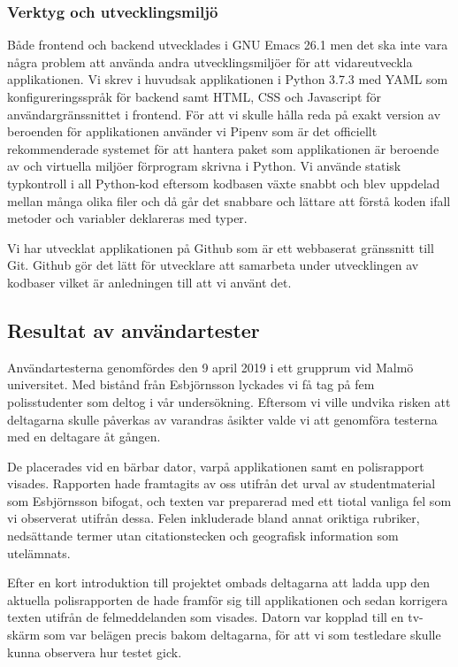 \documentclass[swedish]{maucsthesis}
\begin{document}
\subsubsection{Verktyg och utvecklingsmiljö}

Både frontend och backend utvecklades i GNU Emacs 26.1 men det ska inte vara några
problem att använda andra utvecklingsmiljöer för att vidareutveckla
applikationen. Vi skrev i huvudsak applikationen i Python 3.7.3 med YAML som
konfigureringsspråk för backend samt HTML, CSS och Javascript för
användargränssnittet i frontend. För att vi skulle hålla reda på exakt version
av beroenden för applikationen använder vi Pipenv som är det officiellt
rekommenderade systemet för att hantera paket som applikationen är beroende av
och virtuella miljöer förprogram skrivna i Python. Vi använde statisk typkontroll
i all Python-kod eftersom kodbasen växte snabbt och blev uppdelad
mellan många olika filer och då går det snabbare och lättare att förstå
koden ifall metoder och variabler deklareras med typer.

Vi har utvecklat applikationen på Github som är ett webbaserat gränssnitt till
Git. Github gör det lätt för utvecklare att samarbeta under utvecklingen av kodbaser
vilket är anledningen till att vi använt det.


\subsection{Resultat av användartester}\label{resultatanvändartester}

Användartesterna genomfördes den 9 april 2019 i ett grupprum vid Malmö
universitet. Med bistånd från Esbjörnsson lyckades vi få tag
på fem polisstudenter som deltog i vår undersökning. Eftersom vi ville undvika risken att
deltagarna skulle påverkas av varandras åsikter valde vi att genomföra testerna
med en deltagare åt gången.

De placerades vid en bärbar dator, varpå applikationen samt en polisrapport
visades. Rapporten hade framtagits av oss utifrån det urval av studentmaterial
som Esbjörnsson bifogat, och texten var preparerad med ett tiotal vanliga
fel som vi observerat utifrån dessa. Felen inkluderade bland annat oriktiga
rubriker, nedsättande termer utan citationstecken och geografisk information som
utelämnats.

Efter en kort introduktion till projektet ombads deltagarna att ladda upp den
aktuella polisrapporten de hade framför sig till applikationen och sedan
korrigera texten utifrån de felmeddelanden som visades. Datorn var kopplad till
en tv-skärm som var belägen precis bakom deltagarna, för att vi som
testledare skulle kunna observera hur testet gick.
\end{document}

